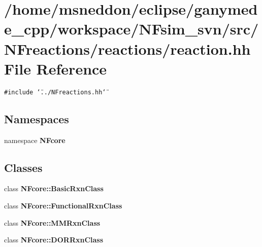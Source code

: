 \section{/home/msneddon/eclipse/ganymede\_\-cpp/workspace/NFsim\_\-svn/src/NFreactions/reactions/reaction.hh File Reference}
\label{reaction_8hh}


{\tt \#include \char`\"{}../NFreactions.hh\char`\"{}}\par
\subsection*{Namespaces}
\begin{CompactItemize}
\item 
namespace {\bf NFcore}
\end{CompactItemize}
\subsection*{Classes}
\begin{CompactItemize}
\item 
class {\bf NFcore::BasicRxnClass}
\item 
class {\bf NFcore::FunctionalRxnClass}
\item 
class {\bf NFcore::MMRxnClass}
\item 
class {\bf NFcore::DORRxnClass}
\end{CompactItemize}
